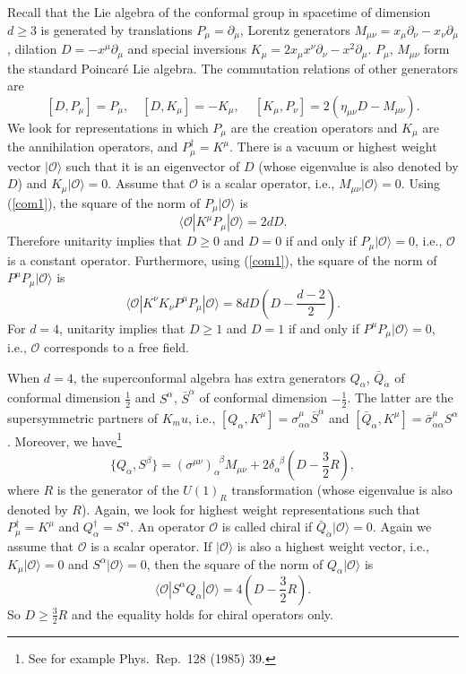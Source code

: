 \documentclass[lecture]{qft-l}
\newcommand{\al}{\alpha}
\newcommand{\del}{\delta}
\newcommand{\sig}{\sigma}
\newcommand{\bra}{\langle}
\newcommand{\ket}{\rangle}
\newcommand{\inv}[1]{\frac{1}{#1}}
\newcommand{\hf}{{\textstyle \inv{2}}}
\newcommand{\pdr}{\partial}
\newcommand{\OO}{{\mathcal O}}
\numberwithin{figure}{chapter}
\begin{document}
Recall that the Lie algebra of the conformal group in spacetime of dimension
$d\ge3$ is generated by translations $P_\mu=\pdr_\mu$, Lorentz generators
$M_{\mu\nu}=x_\mu\pdr_\nu-x_\nu\pdr_\mu$, dilation $D=-x^\mu\pdr_\mu$
and special inversions $K_\mu=2x_\mu x^\nu\pdr_\nu-x^2\pdr_\mu$.
$P_\mu$, $M_{\mu\nu}$ form the standard Poincar\'e Lie algebra.
The commutation relations of other generators are
	\begin{equation}\label{com1}
[D,P_\mu]=P_\mu,\quad [D,K_\mu]=-K_\mu,	\quad
\,[K_\mu,P_\nu]=2(\eta_{\mu\nu}D-M_{\mu\nu}).
	\end{equation}
We look for representations in which $P_\mu$ are the creation operators
and $K_\mu$ are the annihilation operators, and $P_\mu^\dagger=K^\mu$.
There is a vacuum or highest weight vector $|\OO\ket$ such that 
it is an eigenvector of $D$ (whose eigenvalue is also denoted by $D$) 
and $K_\mu|\OO\ket=0$.
Assume that $\OO$ is a scalar operator, i.e., $M_{\mu\nu}|\OO\ket=0$.
Using (\ref{com1}), the square of the norm of $P_\mu|\OO\ket$ is
	\begin{equation}
\bra\OO|K^\mu P_\mu|\OO\ket=2dD.
	\end{equation}
Therefore unitarity implies that $D\ge0$ and $D=0$ 
if and only if $P_\mu|\OO\ket=0$, i.e., $\OO$ is a constant operator.
Furthermore, using (\ref{com1}), the square of the norm of
$P^\mu P_\mu|\OO\ket$ is
	\begin{equation}
\bra\OO|K^\nu K_\nu P^\mu P_\mu|\OO\ket=8dD(D-{\textstyle \frac{d-2}{2}}).
	\end{equation}
For $d=4$, unitarity implies that $D\ge1$ and $D=1$ if and only if
$P^\mu P_\mu|\OO\ket=0$, i.e., $\OO$ corresponds to a free field.

When $d=4$, the superconformal algebra has extra generators 
$Q_\al$, $\bar{Q}_{\dot\al}$ of conformal dimension $\hf$
and $S^\al$, $\bar{S}^{\dot\al}$ of conformal dimension $-\hf$. 
The latter are the supersymmetric partners of $K_mu$, i.e.,
$[Q_\al,K^\mu]=\sig^\mu_{\al\dot\al}\bar{S}^{\dot\al}$ and
$[\bar{Q}_{\dot\al},K^\mu]=\bar{\sig}^\mu_{\dot\al\al}S^\al$.
Moreover, we have\footnote{See for example Phys.\ Rep.\ 128 (1985) 39.}
	\begin{equation}\label{com2}
\{Q_\al,S^\beta\}=(\sig^{\mu\nu})_\al^{\;\;\beta}M_{\mu\nu}
+2\del_\al^{\;\;\beta}(D-{\textstyle \frac{3}{2}}R),
	\end{equation}
where $R$ is the generator of the $U(1)_R$ transformation (whose eigenvalue
is also denoted by $R$).
Again, we look for highest weight representations such that 
$P_\mu^\dagger=K^\mu$ and $Q_\al^\dagger=S^\al$.
An operator $\OO$ is called chiral if $\bar{Q}_{\dot\al}|\OO\ket=0$.
Again we assume that $\OO$ is a scalar operator.
If $|\OO\ket$ is also a highest weight vector, i.e., $K_\mu|\OO\ket=0$
and $S^\al|\OO\ket=0$, then the square of the norm of $Q_\al|\OO\ket$ is
	\begin{equation}
\bra\OO|S^\al Q_\al|\OO\ket=4(D-{\textstyle \frac{3}{2}}R).
	\end{equation}
So $D\ge\frac{3}{2}R$ and the equality holds for chiral operators only.
\end{document}
